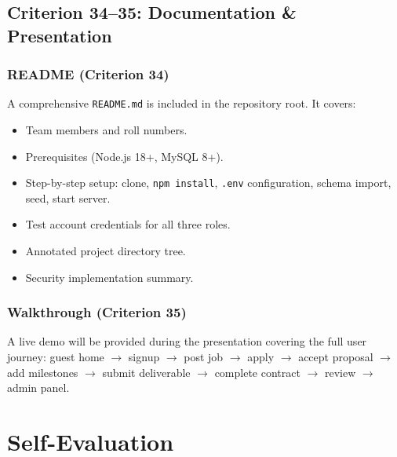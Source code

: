 \documentclass[12pt,a4paper]{article}
\begin{document}
\subsection{Criterion 34--35: Documentation \& Presentation}

\subsubsection{README (Criterion 34)}

A comprehensive \texttt{README.md} is included in the repository root. It covers:
\begin{itemize}[noitemsep]
  \item Team members and roll numbers.
  \item Prerequisites (Node.js 18+, MySQL 8+).
  \item Step-by-step setup: clone, \texttt{npm install}, \texttt{.env} configuration, schema import, seed, start server.
  \item Test account credentials for all three roles.
  \item Annotated project directory tree.
  \item Security implementation summary.
\end{itemize}

\subsubsection{Walkthrough (Criterion 35)}

A live demo will be provided during the presentation covering the full user journey: guest home $\to$ signup $\to$ post job $\to$ apply $\to$ accept proposal $\to$ add milestones $\to$ submit deliverable $\to$ complete contract $\to$ review $\to$ admin panel.

\section{Self-Evaluation}
\end{document}
